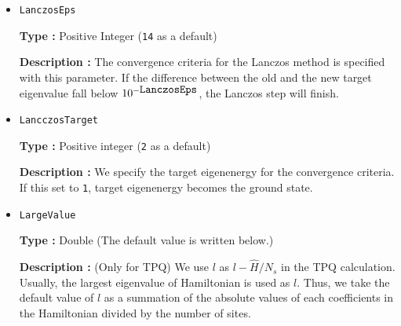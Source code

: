 \begin{itemize}
{\bf Note}:  the following condition must be satisfied: \verb|nvec| $>=$ \verb|exct|.

\item \verb|LanczosEps|

{\bf Type :} Positive Integer (\verb|14| as a default)

{\bf Description :} The convergence criteria for the Lanczos method is specified with this parameter.
If the difference between the old and the new target eigenvalue fall below $10^{- \verb|LanczosEps|}$, 
the Lanczos step will finish.

\item \verb|LancczosTarget|

{\bf Type :} Positive integer (\verb|2| as a default)

{\bf Description :} We specify the target eigenenergy for the convergence criteria.
If this set to \verb|1|, target eigenenergy becomes the ground state.

\item \verb|LargeValue|

{\bf Type :} Double (The default value is written below.)

{\bf Description :} (Only for TPQ) 
We use $l$ as $l-\hat{H}/N_{s}$ in the TPQ calculation.
Usually, the largest eigenvalue of Hamiltonian is used as $l$. 
Thus, we take the default value of $l$
as a summation of the absolute values of each coefficients in the Hamiltonian
divided by the number of sites.


%
%
%
%
%
%
%


\end{itemize}
